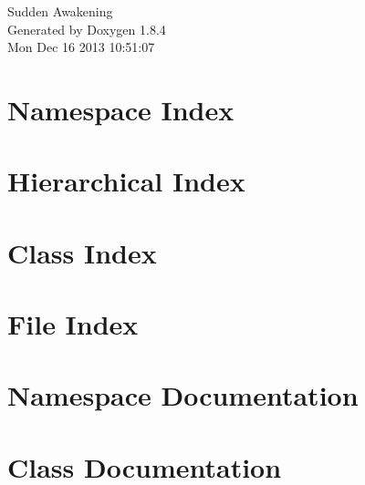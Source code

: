 \documentclass[twoside]{book}
\newcommand{\clearemptydoublepage}{%
  \newpage{\pagestyle{empty}\cleardoublepage}%
}
\begin{document}
\hypersetup{pageanchor=false}
\begin{titlepage}
\vspace*{7cm}
\begin{center}%
{\Large Sudden Awakening }\\
\vspace*{1cm}
{\large Generated by Doxygen 1.8.4}\\
\vspace*{0.5cm}
{\small Mon Dec 16 2013 10:51:07}\\
\end{center}
\end{titlepage}
\clearemptydoublepage
\tableofcontents
\clearemptydoublepage
{}
\hypersetup{pageanchor=true}

\chapter{Namespace Index}

\chapter{Hierarchical Index}

\chapter{Class Index}

\chapter{File Index}

\chapter{Namespace Documentation}



\chapter{Class Documentation}





































\end{document}
